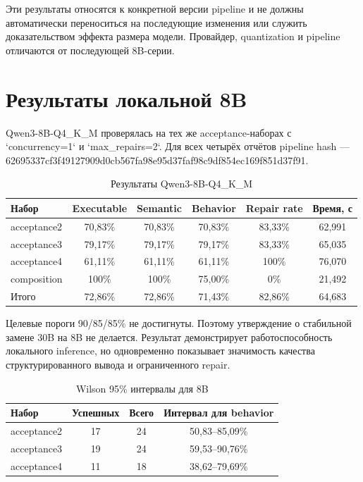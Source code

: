 Эти результаты относятся к конкретной версии pipeline и не должны автоматически переноситься на последующие изменения или служить доказательством эффекта размера модели. Провайдер, quantization и pipeline отличаются от последующей 8B-серии.

\section{Результаты локальной 8B}

Qwen3-8B-Q4\_K\_M проверялась на тех же acceptance-наборах с `concurrency=1` и `max\_repairs=2`. Для всех четырёх отчётов pipeline hash --- {\scriptsize\ttfamily 62695337cf3f4912\allowbreak 7909d0cb567fa98e\allowbreak 95d37faf98c9df85\allowbreak 4ec169f851d37f91}.

\begin{table}[H]
    \centering
    \caption{Результаты Qwen3-8B-Q4\_K\_M}
    \label{tab:results-8b}
    \small
    \begin{tabular}{lccccc}
        \toprule
        Набор & Executable & Semantic & Behavior & Repair rate & Время, с \\
        \midrule
        acceptance2 & 70,83\% & 70,83\% & 70,83\% & 83,33\% & 62,991 \\
        acceptance3 & 79,17\% & 79,17\% & 79,17\% & 83,33\% & 65,035 \\
        acceptance4 & 61,11\% & 61,11\% & 61,11\% & 100\% & 76,070 \\
        composition & 100\% & 100\% & 75,00\% & 0\% & 21,492 \\
        \midrule
        Итого & 72,86\% & 72,86\% & 71,43\% & 82,86\% & 64,683 \\
        \bottomrule
    \end{tabular}
\end{table}

Целевые пороги 90/85/85\% не достигнуты. Поэтому утверждение о стабильной замене 30B на 8B не делается. Результат демонстрирует работоспособность локального inference, но одновременно показывает значимость качества структурированного вывода и ограниченного repair.

\begin{table}[H]
    \centering
    \caption{Wilson 95\% интервалы для 8B}
    \label{tab:wilson-8b}
    \small
    \begin{tabular}{lccc}
        \toprule
        Набор & Успешных & Всего & Интервал для behavior \\
        \midrule
        acceptance2 & 17 & 24 & 50,83--85,09\% \\
        acceptance3 & 19 & 24 & 59,53--90,76\% \\
        acceptance4 & 11 & 18 & 38,62--79,69\% \\
        \bottomrule
    \end{tabular}
\end{table}

